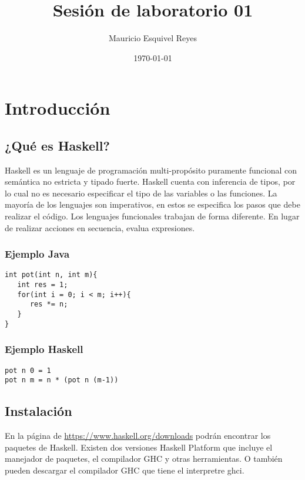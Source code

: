 \documentclass[11pt]{article}
\author{Mauricio Esquivel Reyes}
\date{\today}
\title{Sesión de laboratorio 01}
\begin{document}
\maketitle
\tableofcontents


\section{Introducción}
\label{sec:org26b8e1d}
\subsection{¿Qué es Haskell?}
\label{sec:org3042a54}
Haskell es un lenguaje de programación multi-propósito puramente funcional
con semántica no estricta y tipado fuerte.
Haskell cuenta con inferencia de tipos, por lo cual no es necesario especificar
el tipo de las variables o las funciones.
La mayoría de los lenguajes son imperativos, en estos se especifica los
pasos que debe realizar el código. Los lenguajes funcionales trabajan de forma diferente.
En lugar de realizar acciones en secuencia, evalua expresiones.
\subsubsection{Ejemplo Java}
\label{sec:org0ff66a7}
\begin{verbatim}
int pot(int n, int m){
   int res = 1;
   for(int i = 0; i < m; i++){
      res *= n;
   }
}
\end{verbatim}
\subsubsection{Ejemplo Haskell}
\label{sec:org9a63f3a}
\begin{verbatim}
pot n 0 = 1
pot n m = n * (pot n (m-1)) 
\end{verbatim}
\subsection{Instalación}
\label{sec:org3755eff}
En la página de \url{https://www.haskell.org/downloads} podrán encontrar los 
paquetes de Haskell. Existen dos versiones Haskell Platform que incluye 
el manejador de paquetes, el compilador GHC y otras herramientas.
O también pueden descargar el compilador GHC que tiene el interpretre ghci.
\end{document}
